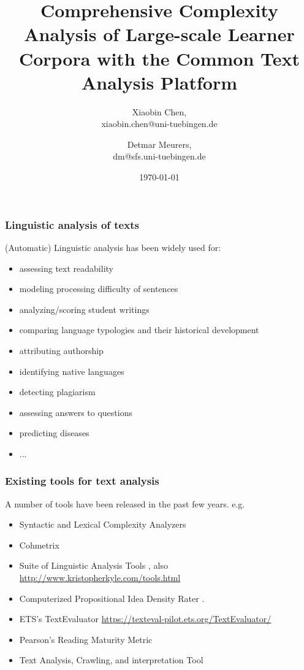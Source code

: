 \documentclass{beamer}
\title{Comprehensive Complexity Analysis of Large-scale Learner Corpora with the Common Text Analysis Platform}
\author[X.B. Chen \& D. Meurers]{Xiaobin Chen, \\
	xiaobin.chen@uni-tuebingen.de \\
	\and 
	Detmar Meurers, \\
	dm@sfs.uni-tuebingen.de
}
\institute[T\"ubingen]{T\"ubingen University}
\date{\today}
\begin{document}
	 \frame{\titlepage}

	\begin{frame}
		\frametitle{Linguistic analysis of texts}

		(Automatic) Linguistic analysis has been widely used for: 
		\begin{itemize}
			\item assessing text readability 
			\item modeling processing difficulty of sentences
			\item analyzing/scoring student writings
			\item comparing language typologies and their historical development
			\item attributing authorship
			\item identifying native languages
			\item detecting plagiarism
			\item assessing answers to questions
			\item predicting diseases
			\item ...
		\end{itemize}
	\end{frame}


	\begin{frame}
		\frametitle{Existing tools for text analysis}

		A number of tools have been released in the past few years. e.g.

		\begin{itemize}
			\item Syntactic and Lexical Complexity Analyzers \citep{Lu-10}
			\item Cohmetrix \citep{McNamara.ea-14}
			\item Suite of Linguistic Analysis Tools
			\citep{Crossley.ea-16a,Crossley.ea-16b}, also
			\url{http://www.kristopherkyle.com/tools.html}
			\item Computerized Propositional Idea Density Rater
			\citep[CPIDR]{Brown.ea-08}. 
			\item ETS's TextEvaluator
			\url{https://texteval-pilot.ets.org/TextEvaluator/}
			\item Pearson's Reading Maturity Metric
			\item Text Analysis, Crawling, and interpretation Tool
			\citep[TACIT]{Dehghani.ea-16}
		\end{itemize}
	\end{frame}
\end{document}
